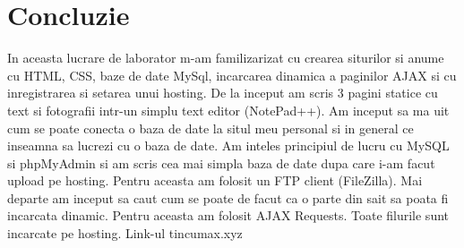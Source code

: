 \section*{Concluzie}


In aceasta lucrare de laborator m-am familizarizat cu crearea siturilor si anume cu HTML, CSS, baze de date MySql, incarcarea dinamica a paginilor AJAX si cu inregistrarea si setarea unui hosting. De la inceput am scris 3 pagini statice cu text si fotografii intr-un simplu text editor (NotePad++). Am inceput sa ma uit cum se poate conecta o baza de date la situl meu personal si in general ce inseamna sa lucrezi cu o baza de date. Am inteles principiul de lucru cu MySQL si phpMyAdmin si am scris cea mai simpla baza de date dupa care i-am facut upload pe hosting. Pentru aceasta am folosit un FTP client (FileZilla). Mai departe am inceput sa caut cum se poate de facut ca o parte din sait sa poata fi incarcata dinamic. Pentru aceasta am folosit AJAX Requests. Toate filurile sunt incarcate pe hosting. Link-ul tincumax.xyz

\clearpage